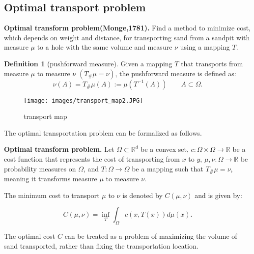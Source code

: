 \documentclass[a4j,10pt, twocolumn, dvipdfmx]{article}
\theoremstyle{definition}
\newtheorem{dfn}{Definition}[section]
\begin{document}
\subsection{Optimal transport problem}
\textbf{Optimal transform problem(Monge,1781).}
Find a method to minimize cost, 
which depends on weight and distance, 
for transporting sand from a sandpit with measure $\mu$ to a hole with the same volume and measure $\nu$ using a mapping $T$.

\begin{dfn}[pushforward measure]
    Given a mapping $T$ that transports from measure $\mu$ to measure $\nu$ $(T_\#\mu = \nu)$, 
    the pushforward measure is defined as:
    \begin{equation*}
        \nu (A) =  T_\#\mu (A) := \mu (T^{-1} (A)) \qquad A \subset \Omega.
    \end{equation*}
\end{dfn}

\begin{figure}[htbp]
    \begin{center}
        \texttt{[image: images/transport\_map2.JPG]}
        \caption{transport map}
    \end{center}
\end{figure}

The optimal transportation problem can be formalized as follows.
\newline

\textbf{Optimal transform problem.}
Let $\Omega \subset \mathbb{R}^d$ be a convex set,
$c: \Omega \times \Omega \to \mathbb{R}$ be a cost function that represents the cost of transporting from $x$ to $y$, 
$\mu, \nu : \Omega \to \mathbb{R}$ be probability measures on $\Omega$, and $T: \Omega \to \Omega$ be a mapping such that $T_\#\mu = \nu$, 
meaning it transforms measure $\mu$ to measure $\nu$.

The minimum cost to transport $\mu$ to $\nu$ is denoted by $C(\mu, \nu)$ and is given by:

\begin{equation*}
    C(\mu, \nu) = \inf_T \int_\Omega c(x, T(x)) d \mu (x).
\end{equation*}

The optimal cost $C$ can be treated as a problem of maximizing the volume of sand transported, 
rather than fixing the transportation location.
\newline
\end{document}
